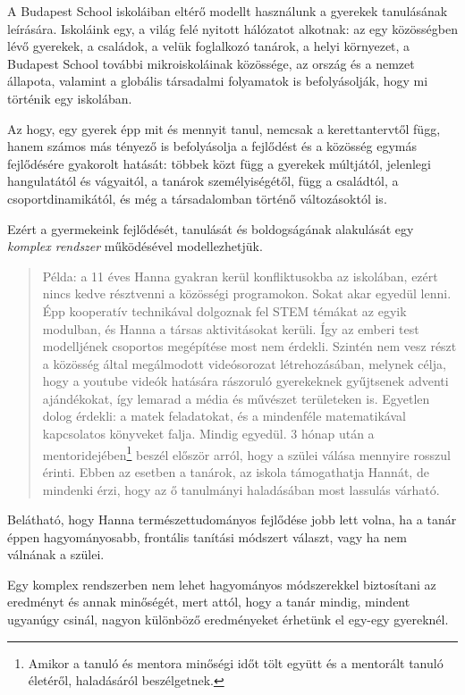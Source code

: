 A Budapest School iskoláiban eltérő modellt használunk a gyerekek tanulásának leírására. Iskoláink egy, a világ felé nyitott hálózatot alkotnak: az egy közösségben lévő gyerekek, a családok, a velük foglalkozó tanárok, a helyi környezet, a Budapest School további mikroiskoláinak közössége, az ország és a nemzet állapota, valamint a globális társadalmi folyamatok is befolyásolják, hogy mi történik egy iskolában.

Az hogy, egy gyerek épp mit és mennyit tanul, nemcsak a kerettantervtől függ, hanem számos más tényező is befolyásolja a fejlődést és a közösség egymás fejlődésére gyakorolt hatását: többek közt függ a gyerekek múltjától, jelenlegi hangulatától és vágyaitól, a tanárok személyiségétől, függ a családtól, a csoportdinamikától, és még a társadalomban történő változásoktól is.

Ezért a gyermekeink fejlődését, tanulását és boldogságának alakulását egy \emph{komplex rendszer} működésével modellezhetjük.

\begin{quote}
Példa: a 11 éves Hanna gyakran kerül konfliktusokba az iskolában, ezért nincs kedve résztvenni a közösségi programokon. Sokat akar egyedül lenni. Épp kooperatív technikával dolgoznak fel STEM témákat az egyik modulban, és Hanna a társas aktivitásokat kerüli. Így az emberi test modelljének csoportos megépítése most nem érdekli.  Szintén nem vesz részt a közösség által megálmodott videósorozat létrehozásában, melynek célja, hogy  a youtube videók hatására rászoruló gyerekeknek gyűjtsenek adventi ajándékokat, így lemarad a média és művészet területeken is. Egyetlen dolog érdekli: a matek feladatokat, és a mindenféle matematikával kapcsolatos könyveket falja. Mindig egyedül. 3 hónap után a mentoridejében\footnote{Amikor a tanuló és mentora minőségi időt tölt együtt és a mentorált tanuló életéről, haladásáról beszélgetnek.} beszél először arról, hogy a szülei válása mennyire rosszul érinti. Ebben az esetben a tanárok, az iskola támogathatja  Hannát, de mindenki érzi, hogy az ő tanulmányi haladásában most lassulás várható.
\end{quote}
Belátható, hogy Hanna természettudományos fejlődése jobb lett volna, ha a tanár éppen hagyományosabb, frontális tanítási módszert választ, vagy ha nem válnának a szülei.

Egy komplex rendszerben nem lehet hagyományos módszerekkel biztosítani az eredményt és annak minőségét, mert attól, hogy a tanár mindig, mindent ugyanúgy csinál, nagyon különböző eredményeket érhetünk el egy-egy gyereknél.



